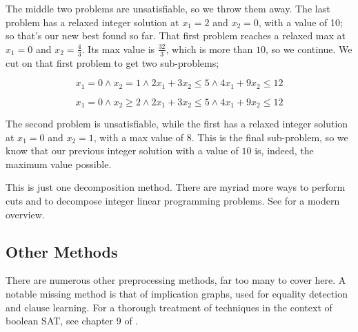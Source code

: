 The middle two problems are unsatisfiable, so we throw them away. The last problem has a relaxed integer solution at $x_1 = 2$ and $x_2 = 0$, with a value of 10; so that's our new best found so far. That first problem reaches a relaxed max at $x_1 = 0$ and $x_2 = \frac{4}{3}$. Its max value is $\frac{32}{3}$, which is more than $10$, so we continue. We cut on that first problem to get two sub-problems;

\begin{equation}
    x_1 = 0 \wedge x_2 = 1 \wedge 2x_1 + 3x_2 \leq 5 \wedge 4x_1 + 9x_2 \leq 12
\end{equation}

\begin{equation}
    x_1 = 0 \wedge x_2 \geq 2 \wedge 2x_1 + 3x_2 \leq 5 \wedge 4x_1 + 9x_2 \leq 12
\end{equation}

The second problem is unsatisfiable, while the first has a relaxed integer solution at $x_1 = 0$ and $x_2 = 1$, with a max value of $8$. This is the final sub-problem, so we know that our previous integer solution with a value of $10$ is, indeed, the maximum value possible.

This is just one decomposition method. There are myriad more ways to perform cuts and to decompose integer linear programming problems. See \citep{galati2010decomposition} for a modern overview.

\subsection{Other Methods}\label{sec:other-preproc}

There are numerous other preprocessing methods, far too many to cover here. A notable missing method is that of implication graphs, used for equality detection and clause learning. For a thorough treatment of techniques in the context of boolean SAT, see chapter 9 of \citep{biere2009handbook}.